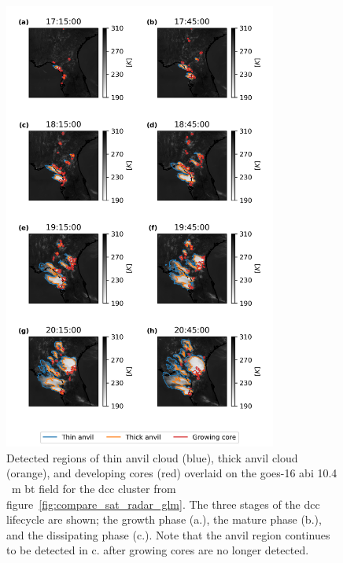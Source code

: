 \begin{figure}[t]
    \centering\includegraphics[width=0.8\textwidth]{figures/chapter1_18.png}
    \caption[
    Detected regions of thin anvil cloud (blue), thick anvil cloud (orange), and developing cores (red) overlaid on the \acrshort{goes}-16 \acrshort{abi} 10.4\,\unit{\mu m} \acrshort{bt} field for the \acrshort{dcc} cluster from figure~\ref{fig:compare_sat_radar_glm}
    ]{
    Detected regions of thin anvil cloud (blue), thick anvil cloud (orange), and developing cores (red) overlaid on the \acrshort{goes}-16 \acrshort{abi} 10.4\,\unit{\mu m} \acrshort{bt} field for the \acrshort{dcc} cluster from figure~\ref{fig:compare_sat_radar_glm}. The three stages of the \acrshort{dcc} lifecycle are shown; the growth phase (a.), the mature phase (b.), and the dissipating phase (c.). Note that the anvil region continues to be detected in c. after growing cores are no longer detected.
    }
    \label{fig:detected_anvils}
\end{figure}

